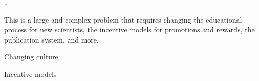 \documentclass[ChapterTOCs,krantz2]{krantz} %
\theoremstyle{definition}
\begin{document}
\ldots

This is a large and complex problem that requires changing the educational
process for new scientists, the incentive models for promotions and
rewards, the publication system, and more.


Changing culture

%
%
%
%
%
%
%
%
%

Incentive models
\end{document}
